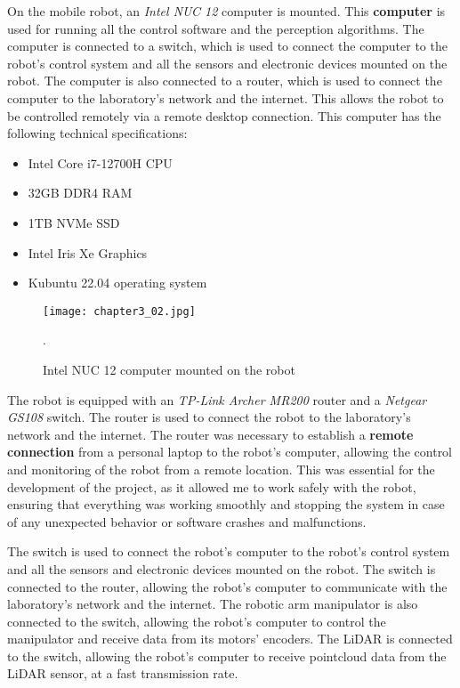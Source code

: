 On the mobile robot, an \textit{Intel NUC 12} computer is mounted. This \textbf{computer} is used for running all the control
software and the perception algorithms. The computer is connected to a switch, which is used to connect
the computer to the robot's control system and all the sensors and electronic devices mounted on the robot.
The computer is also connected to a router, which is used to connect the computer to the laboratory's network
and the internet. This allows the robot to be controlled remotely via a remote desktop connection.
This computer has the following technical specifications:

\begin{itemize}
    \item Intel Core i7-12700H CPU
    \item 32GB DDR4 RAM
    \item 1TB NVMe SSD
    \item Intel Iris Xe Graphics
    \item Kubuntu 22.04 operating system
\end{itemize}

\begin{figure}[t]
    \centering
    \texttt{[image: chapter3\_02.jpg]}
    \captionsetup{width=1\linewidth}
    \caption{Intel NUC 12 computer mounted on the robot}.
    \label{fig:c3_img02}
\end{figure}

The robot is equipped with an \textit{TP-Link Archer MR200} router and a \textit{Netgear GS108} switch.
The router is used to connect the robot to the laboratory's network and the internet. The router was necessary to
establish a \textbf{remote connection} from a personal laptop to the robot's computer, allowing the control and monitoring
of the robot from a remote location. This was essential for the development of the project, as it allowed me to
work safely with the robot, ensuring that everything was working smoothly and stopping the system in case of any
unexpected behavior or software crashes and malfunctions.

The switch is used to connect the robot's computer to the robot's control system and all the sensors
and electronic devices mounted on the robot. The switch is connected to the router, allowing the robot's computer
to communicate with the laboratory's network and the internet. The robotic arm manipulator is also connected to the switch,
allowing the robot's computer to control the manipulator and receive data from its motors' encoders. 
The LiDAR is connected to the switch, allowing the robot's computer to receive pointcloud data from the LiDAR sensor,
at a fast transmission rate.
 

